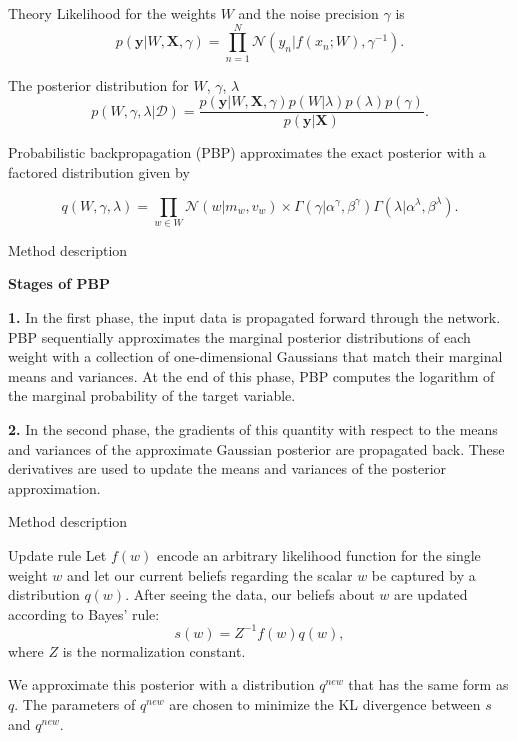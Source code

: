 \documentclass[13pt]{beamer}				\usepackage{graphicx}
\begin{document}
\begin{frame}{Theory}
Likelihood for the weights $W$ and the noise precision $\gamma$ is
$$p(\textbf{y}| W, \textbf{X}, \gamma) = \prod \limits_{n = 1}^N  \mathcal{N}(y_n | f (x_n; W), \gamma^{-1}).$$

The posterior distribution for $W$, $\gamma$, $\lambda$
$$p(W, \gamma, \lambda | \mathcal{D}) = \dfrac{p(\textbf{y}| W, \textbf{X}, \gamma) p(W|\lambda)p(\lambda)p(\gamma)}{p(\textbf{y} | \textbf{X})}.$$

Probabilistic backpropagation (PBP) approximates the exact posterior with a factored distribution given by

$$q(W, \gamma, \lambda) = \prod \limits_{w \in W} \mathcal{N}(w | m_{w}, v_{w}) \times \Gamma(\gamma| \alpha^{\gamma}, \beta^{\gamma})\Gamma(\lambda| \alpha^{\lambda}, \beta^{\lambda}).$$
\end{frame}
\begin{frame}{Method description}

\textbf{Stages of PBP}

\textbf{1.}
In the first phase, the input data is propagated forward through the network. PBP sequentially approximates the marginal posterior distributions of each weight with a collection of one-dimensional Gaussians that match their marginal means and variances. At the end of this phase, PBP computes the logarithm of the marginal probability of the target variable.
\pause

\textbf{2.} In the second phase, the gradients of this quantity with respect to the means and variances of the approximate Gaussian
posterior are propagated back. These derivatives are used to update the means and variances of the posterior approximation.
\end{frame}

\begin{frame}{Method description}
\begin{block}{Update rule}
Let $f(w)$ encode an arbitrary likelihood function for the single weight $w$ and let our current beliefs regarding the scalar $w$ be captured by a distribution $q(w)$. After seeing the data, our beliefs
about $w$ are updated according to Bayes’ rule:
$$s(w) = Z^{-1} f(w) q(w),$$
where $Z$ is the normalization constant.

We approximate this posterior with a distribution $q^{new}$ that has the same form as $q$. The parameters of $q^{new}$ are chosen to minimize the KL divergence between $s$ and $q^{new}$.
\end{block}
\end{frame}
\end{document}
